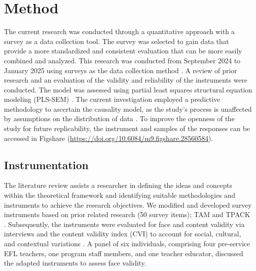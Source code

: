 \documentclass[english]{textolivre}
\begin{document}
\section{Method}\label{sec-autores}
The current research was conducted through a quantitative approach with a survey as a data collection tool. The survey was selected to gain data that provide a more standardized and consistent evaluation that can be more easily combined and analyzed. This research was conducted from September 2024 to January 2025 using surveys as the data collection method \cite{ball2019survey,evans2005value}. A review of prior research and an evaluation of the validity and reliability of the instruments were conducted. The model was assessed using partial least squares structural equation modeling (PLS-SEM) \cite{cepeda2024plssem,habibi2024access,vaithilingam2024robustness}. The current investigation employed a predictive methodology to ascertain the causality model, as the study’s process is unaffected by assumptions on the distribution of data \cite{habibi2024utaut}. To improve the openness of the study for future replicability, the instrument and samples of the responses can be accessed in Figshare (\url{https://doi.org/10.6084/m9.figshare.28560584}).

\subsection{Instrumentation}\label{sec-idioma}
The literature review assists a researcher in defining the ideas and concepts within the theoretical framework and identifying suitable methodologies and instruments to achieve the research objectives. We modified and developed survey instruments based on prior related research (50 survey items); TAM \cite{aladwan2024useintention,wang2022tam2} and TPACK \cite{aladwan2024useintention,habibi2020tpack,mishra2009tpack}. Subsequently, the instruments were evaluated for face and content validity via interviews and the content validity index (CVI) to account for social, cultural, and contextual variations \cite{oliveira2022insulin}. A panel of six individuals, comprising four pre-service EFL teachers, one program staff members, and one teacher educator, discussed the adapted instruments to assess face validity. 
\end{document}
